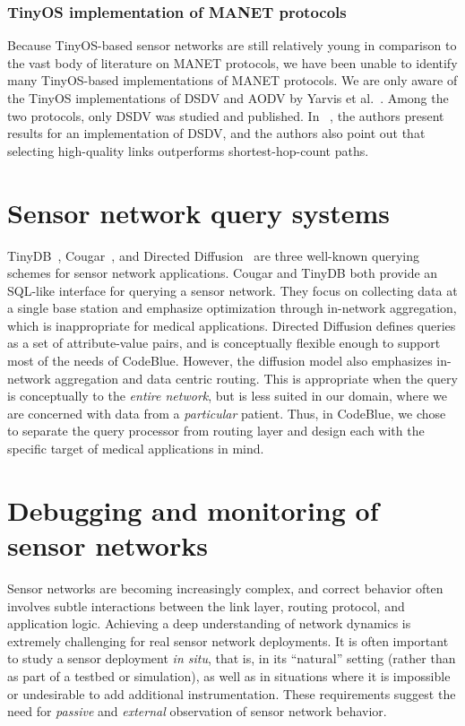\subsubsection{TinyOS implementation of MANET protocols}

Because TinyOS-based sensor networks are still relatively young
in comparison to the vast body of literature on MANET protocols,
we have been unable to identify many TinyOS-based implementations
of MANET protocols. We are only aware of the TinyOS implementations 
of DSDV and AODV by Yarvis et al.~\cite{yarvis, tinyaodv}. 
Among the two protocols, only DSDV was studied and published. 
In ~\cite{yarvis}, the authors present results for an implementation
of DSDV, and the authors also point out that selecting
high-quality links outperforms shortest-hop-count paths.

\section{Sensor network query systems}

TinyDB~\cite{tinydb-osdi}, Cougar~\cite{cougar-sigmodrecord}, and
Directed Diffusion~\cite{diffusion} are three well-known querying
schemes for sensor network applications. Cougar and TinyDB both
provide an SQL-like interface for querying a sensor network.  They
focus on collecting data at a single base station and emphasize
optimization through in-network aggregation, which is inappropriate
for medical applications.  Directed Diffusion defines queries as a set
of attribute-value pairs, and is conceptually flexible enough to
support most of the needs of CodeBlue.  However, the diffusion model
also emphasizes in-network aggregation and data centric routing.  This
is appropriate when the query is conceptually to the {\em entire
network}, but is less suited in our domain, where we are concerned
with data from a {\em particular} patient. Thus, in CodeBlue, we chose to 
separate the query processor from routing layer and design each with the
specific target of medical applications in mind.

\section{Debugging and monitoring of sensor networks}
\label{sec-livenet-background}

Sensor networks are becoming increasingly complex, and correct
behavior often involves subtle interactions between the link layer, 
routing protocol, and application logic. Achieving a deep
understanding of network dynamics is extremely challenging for 
real sensor network deployments. It is often important to study a
sensor deployment {\em in situ}, that is, in its ``natural'' setting
(rather than as part of a testbed or simulation), as well as in
situations where it is impossible or undesirable to add additional
instrumentation. These requirements suggest 
the need for {\em passive} and {\em external} observation of
sensor network behavior.

